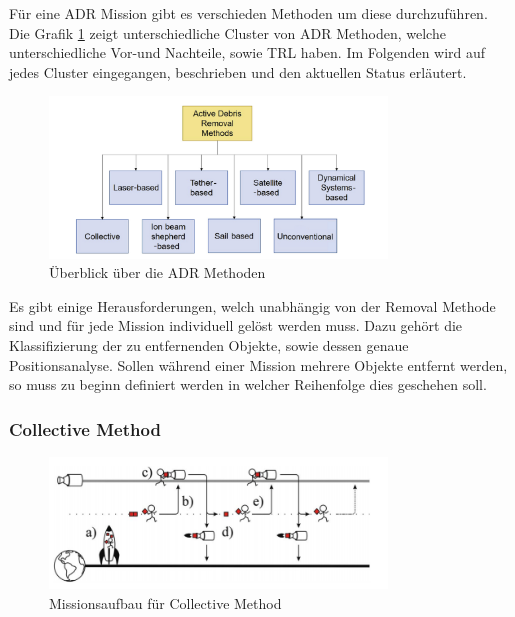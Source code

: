 	Für eine ADR Mission gibt es verschieden Methoden um diese durchzuführen. Die Grafik \ref{fig:ADR_Methoden} zeigt unterschiedliche Cluster von ADR Methoden, welche unterschiedliche Vor-und Nachteile, sowie TRL haben. Im Folgenden wird auf jedes Cluster eingegangen, beschrieben und den aktuellen Status erläutert.
	
				\begin{figure}[h]
				\centering
					\includegraphics[width=0.80\textwidth]{./graphics/ADR/ADR_methods.PNG}
				\caption{Überblick über die ADR Methoden \cite{Mark.2019}}
				\label{fig:ADR_Methoden} 
			\end{figure}
			
	
Es gibt einige Herausforderungen, welch unabhängig von der Removal Methode sind und für jede Mission individuell gelöst werden muss. Dazu gehört die Klassifizierung der zu entfernenden Objekte, sowie dessen genaue Positionsanalyse. Sollen während einer Mission mehrere Objekte entfernt werden, so muss zu beginn definiert werden in welcher Reihenfolge dies geschehen soll. 

	\subsubsection{Collective Method}
	
				\begin{figure}[h]
			\centering
					\includegraphics[width=0.80\textwidth]{./graphics/ADR/collective_method.PNG}
				\caption{Missionsaufbau für Collective Method \cite{Peters.2016}}
				\label{fig:Sammelmethoden}
			\end{figure}
	
